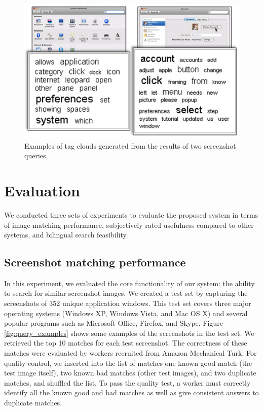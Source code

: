 \documentclass{www2010-submission}
\begin{document}
\begin{figure}
\includegraphics[width=1\columnwidth]{figure/tag_clouds.png}
\caption{Examples of tag clouds generated from the 
results of two screenshot queries.}
\label{fig:tag_clouds}
\end{figure}


\section{Evaluation}
\label{sec:evaluation}

We conducted three sets of experiments to evaluate the proposed system
in terms of image matching performance, subjectively rated usefulness
compared to other systems, and bilingual search feasibility.

\subsection{Screenshot matching performance}

In this experiment, we evaluated the core functionality of our system:
the ability to search for similar screenshot images.  We created a
test set by capturing the screenshots of 352 unique application
windows. This test set covers three major operating systems (Windows
XP, Windows Vista, and Mac OS X) and several popular programs such as
Microsoft Office, Firefox, and Skype. Figure \ref{fig:query_examples}
shows some examples of the screenshots in the test set. We retrieved
the top 10 matches for each test screenshot. The correctness of these
matches were evaluated by workers recruited from Amazon Mechanical
Turk. For quality control, we inserted into the list of matches one
known good match (the test image itself), two known bad matches (other
test images), and two duplicate matches, and shuffled the list. To
pass the quality test, a worker must correctly identify all the known
good and bad matches as well as give consistent answers to duplicate
matches. 
\end{document}
